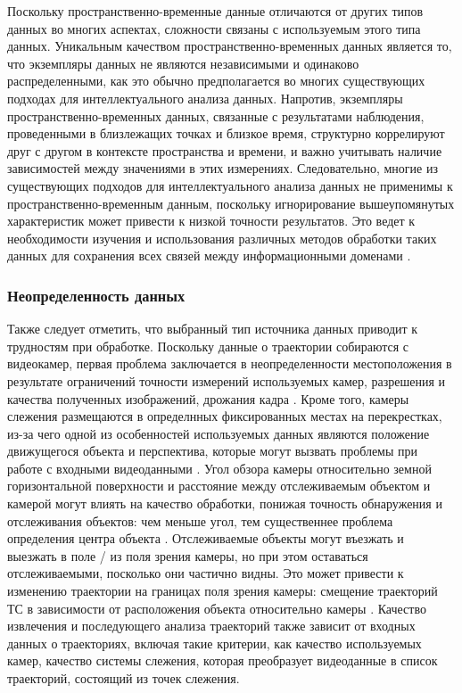 Поскольку пространственно-временные данные отличаются от других типов данных во многих аспектах, сложности связаны с используемым этого типа данных. Уникальным качеством пространственно-временных данных является то, что экземпляры данных не являются независимыми и одинаково распределенными, как это обычно предполагается во многих существующих подходах для интеллектуального анализа данных. Напротив, экземпляры пространственно-временных данных, связанные с результатами наблюдения, проведенными в близлежащих точках и близкое время, структурно коррелируют друг с другом в контексте пространства и времени, и важно учитывать наличие зависимостей между значениями в этих измерениях. Следовательно, многие из существующих подходов для интеллектуального анализа данных не применимы к пространственно-временным данным, поскольку игнорирование вышеупомянутых характеристик может привести к низкой точности результатов. Это ведет к необходимости изучения и использования различных методов обработки таких данных для сохранения всех связей между информационными доменами \cite{article:1_survey_stdm}.

\subsubsection{Неопределенность данных}

Также следует отметить, что выбранный тип источника данных приводит к трудностям при обработке. Поскольку данные о траектории собираются с видеокамер, первая проблема заключается в неопределенности местоположения в результате ограничений точности измерений используемых камер, разрешения и качества полученных изображений, дрожания кадра \cite{article:4_detect_eatp}. Кроме того, камеры слежения размещаются в определнных фиксированных местах на перекрестках, из-за чего одной из особенностей используемых данных являются положение движущегося объекта и перспектива, которые могут вызвать проблемы при работе с входными видеоданными \cite{article:6_survey_anom_det_rtuvs}. Угол обзора камеры относительно земной горизонтальной поверхности и расстояние между отслеживаемым объектом и камерой могут влиять на качество обработки, понижая точность обнаружения и отслеживания объектов: чем меньше угол, тем существеннее проблема определения центра объекта \cite{article:9_trb_vc_aev_sc}\cite{article:4_detect_eatp}. Отслеживаемые объекты могут въезжать и выезжать в поле / из поля зрения камеры, но при этом оставаться отслеживаемыми, посколько они частично видны. Это может привести к изменению траектории на границах поля зрения камеры: смещение траекторий ТС в зависимости от расположения объекта относительно камеры \cite{article:4_detect_eatp}. Качество извлечения и последующего анализа траекторий также зависит от входных данных о траекториях, включая такие критерии, как качество используемых камер, качество системы слежения, которая преобразует видеоданные в список траекторий, состоящий из точек слежения.

